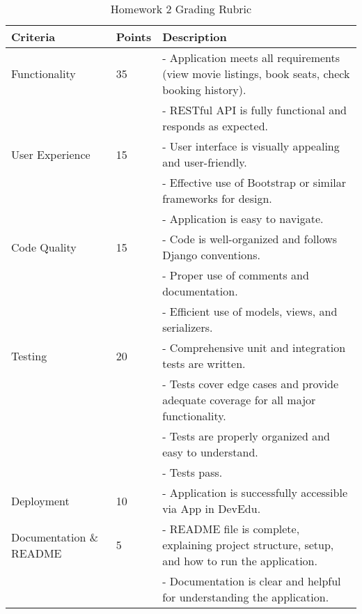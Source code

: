 \documentclass{article}
\begin{document}
\begin{table}[ht]
\centering
\small
\begin{tabular}{l l p{8cm}}
\hline
\textbf{Criteria} & \textbf{Points} & \textbf{Description} \\
\hline
Functionality &
35 &
- Application meets all requirements (view movie listings, book seats, check booking history).\\
& &
- RESTful API is fully functional and responds as expected. \newline \\
User Experience &
15 &
- User interface is visually appealing and user-friendly.\\
& &
- Effective use of Bootstrap or similar frameworks for design.\\
& &
- Application is easy to navigate. \newline \\
Code Quality &
15 &
- Code is well-organized and follows Django conventions. \\
& &
- Proper use of comments and documentation. \\
& &
- Efficient use of models, views, and serializers. \newline \\
Testing &
20 &
- Comprehensive unit and integration tests are written.\\
& &
- Tests cover edge cases and provide adequate coverage for all major functionality.\\
& &
- Tests are properly organized and easy to understand. \\
& & 
- Tests pass. \newline \\
Deployment &
10 &
- Application is successfully accessible via App in DevEdu. \newline \\ 
Documentation \& README &
5 &
- README file is complete, explaining project structure, setup, and how to run the application.\\
& &
- Documentation is clear and helpful for understanding the application.\\
\hline
\end{tabular}
\caption{Homework 2 Grading Rubric}
\end{table}
\end{document}

